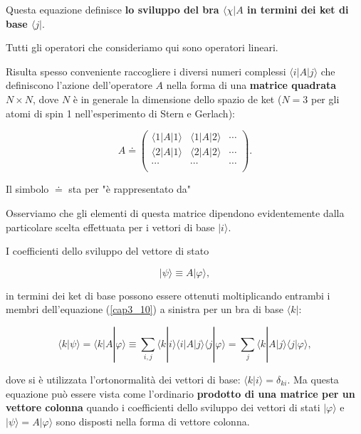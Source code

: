 Questa equazione definisce \textbf{lo sviluppo del bra $\langle \chi |A$ in termini dei ket di base $\langle j |$}.

Tutti gli operatori che consideriamo qui sono operatori lineari.

Risulta spesso conveniente raccogliere i diversi numeri complessi $\langle i | A | j \rangle$ che definiscono l'azione dell'operatore $A$ nella forma di una \textbf{matrice quadrata} $N\times N$, dove $N$ è in generale la dimensione dello spazio de ket ($N=3$ per gli atomi di spin 1 nell'esperimento di Stern e Gerlach):

\begin{equation}
A \doteq
\begin{pmatrix}
\langle 1 | A  | 1 \rangle & \langle 1 | A  | 2 \rangle & \cdots\\
\langle 2 | A  | 1 \rangle & \langle 2 | A  | 2 \rangle & \cdots \\
\cdots & \cdots & \cdots \\
\end{pmatrix} .
\end{equation}

Il simbolo $\doteq$ sta per "è rappresentato da"

Osserviamo che gli elementi di questa matrice dipendono evidentemente dalla particolare scelta effettuata per i vettori di base $| i \rangle$.

I coefficienti dello sviluppo del vettore di stato

\begin{equation}
| \psi \rangle \equiv A | \varphi \rangle ,
\end{equation}

in termini dei ket di base possono essere ottenuti moltiplicando entrambi i membri dell'equazione (\ref{cap3_10}) a sinistra per un bra di base $\langle k | $:

\begin{equation}
\langle k | \psi \rangle = \langle k | A | \varphi \rangle \equiv \sum \limits_{i,j} \langle k | i \rangle \langle i | A | j\rangle \langle j | \varphi \rangle = \sum \limits_{j} \langle k | A | j \rangle \langle j | \varphi \rangle ,
\end{equation}

dove si è utilizzata l'ortonormalità dei vettori di base: $\langle k | i \rangle =\delta_{ki}$. Ma questa equazione può essere vista come l'ordinario \textbf{prodotto di una matrice per un vettore colonna} quando i coefficienti dello sviluppo dei vettori di stati $| \varphi \rangle$ e $| \psi \rangle =A | \varphi \rangle$ sono disposti nella forma di vettore colonna.

